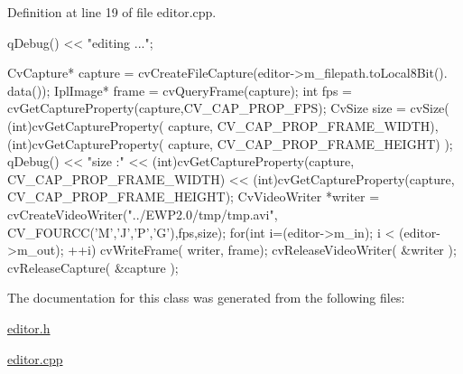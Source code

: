 \-Definition at line 19 of file editor.\-cpp.


\begin{DoxyCode}
                                     {
    qDebug() << "editing ...";

    CvCapture* capture = cvCreateFileCapture(editor->m_filepath.toLocal8Bit().
      data());
    IplImage* frame = cvQueryFrame(capture);
    int fps = cvGetCaptureProperty(capture,CV_CAP_PROP_FPS);
    CvSize size = cvSize(
        (int)cvGetCaptureProperty( capture, CV_CAP_PROP_FRAME_WIDTH),
        (int)cvGetCaptureProperty( capture, CV_CAP_PROP_FRAME_HEIGHT)
    );
    qDebug() << "size :" << (int)cvGetCaptureProperty(capture, 
      CV_CAP_PROP_FRAME_WIDTH) << (int)cvGetCaptureProperty(capture, CV_CAP_PROP_FRAME_HEIGHT);
    CvVideoWriter *writer = cvCreateVideoWriter("../EWP2.0/tmp/tmp.avi",
      CV_FOURCC('M','J','P','G'),fps,size);
    for(int i=(editor->m_in); i < (editor->m_out); ++i){
        cvWriteFrame( writer, frame);
    }
    cvReleaseVideoWriter( &writer );
    cvReleaseCapture( &capture );
}
\end{DoxyCode}


\-The documentation for this class was generated from the following files\-:\begin{DoxyCompactItemize}
\item 
\hyperlink{editor_8h}{editor.\-h}\item 
\hyperlink{editor_8cpp}{editor.\-cpp}\end{DoxyCompactItemize}
